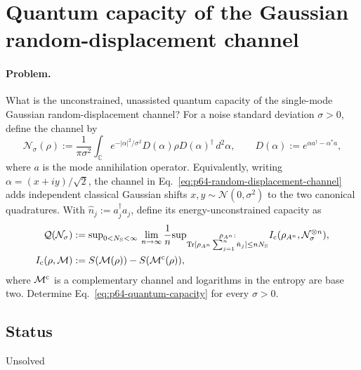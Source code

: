 \section{Quantum capacity of the Gaussian random-displacement channel}
\label{sec:problem-64}

\paragraph{Problem.}
What is the unconstrained, unassisted quantum capacity of the single-mode
Gaussian random-displacement channel?  For a noise standard deviation
$\sigma>0$, define the channel by
\begin{equation}
  \mathcal N_\sigma(\rho)
  :=\frac{1}{\pi\sigma^2}\int_{\mathbb C}
       e^{-\lvert\alpha\rvert^2/\sigma^2}
       D(\alpha)\rho D(\alpha)^\dagger\,d^2\alpha,
  \qquad
  D(\alpha):=e^{\alpha a^\dagger-\alpha^*a},
  \label{eq:p64-random-displacement-channel}
\end{equation}
where $a$ is the mode annihilation operator.  Equivalently, writing
$\alpha=(x+iy)/\sqrt2$, the channel in
Eq.~\eqref{eq:p64-random-displacement-channel} adds independent classical
Gaussian shifts $x,y\sim\mathcal N(0,\sigma^2)$ to the two canonical
quadratures.  With $\hat n_j:=a_j^\dagger a_j$, define its
energy-unconstrained capacity as
\begin{equation}
  \begin{aligned}
  \mathcal Q(\mathcal N_\sigma)
  &:={\sup}_{0<N_{\rm S}<\infty}\,
     \lim_{n\to\infty}\frac1n
     {\sup}_{\substack{\rho_{A^n}:\\
       \operatorname{Tr}[\rho_{A^n}\sum_{j=1}^n\hat n_j]
       \leq nN_{\rm S}}}
       I_{\rm c}(\rho_{A^n},\mathcal N_\sigma^{\otimes n}),\\
  I_{\rm c}(\rho,\mathcal M)
  &:=S(\mathcal M(\rho))-S(\mathcal M^{\rm c}(\rho)),
  \end{aligned}
  \label{eq:p64-quantum-capacity}
\end{equation}
where $\mathcal M^{\rm c}$ is a complementary channel and logarithms in the
entropy are base two.  Determine Eq.~\eqref{eq:p64-quantum-capacity} for every
$\sigma>0$.

\subsection*{Status}

Unsolved

